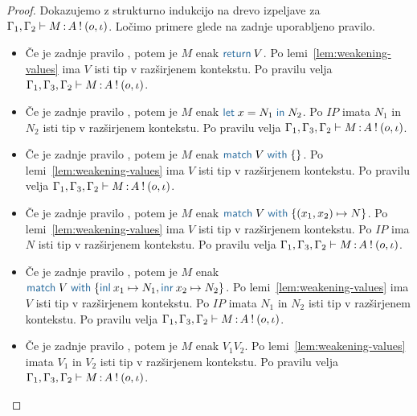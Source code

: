 \begin{proof}
	Dokazujemo z strukturno indukcijo na drevo izpeljave za $\Gamma_1, \Gamma_2 \vdash M \mathinner{:} A \mathbin{!} (o, \iota)$.
	Ločimo primere glede na zadnje uporabljeno pravilo.
	
	\begin{itemize}
		\item Če je zadnje pravilo , potem je $M$ enak $\tmreturn{V}$.
		Po lemi~\ref{lem:weakening-values} ima $V$ isti tip v razširjenem kontekstu.
		Po pravilu  velja $\Gamma_1, \Gamma_3, \Gamma_2 \vdash M \mathinner{:} A \mathbin{!} (o, \iota)$.
		
		\item Če je zadnje pravilo , potem je $M$ enak $\tmlet{x}{N_1}{N_2}$.
		Po $IP$ imata $N_1$ in $N_2$ isti tip v razširjenem kontekstu.
		Po pravilu  velja $\Gamma_1, \Gamma_3, \Gamma_2 \vdash M \mathinner{:} A \mathbin{!} (o, \iota)$.
		
		\item Če je zadnje pravilo , potem je $M$ enak $\tmmatch{V}{}$.
		Po lemi~\ref{lem:weakening-values} ima $V$ isti tip v razširjenem kontekstu.
		Po pravilu  velja $\Gamma_1, \Gamma_3, \Gamma_2 \vdash M \mathinner{:} A \mathbin{!} (o, \iota)$.
		
		\item Če je zadnje pravilo , potem je $M$ enak $\tmmatch{V}{(x_1,x_2) \mapsto N}$. 
		Po lemi~\ref{lem:weakening-values} ima $V$ isti tip v razširjenem kontekstu.
		Po $IP$ ima $N$ isti tip v razširjenem kontekstu.
		Po pravilu  velja $\Gamma_1, \Gamma_3, \Gamma_2 \vdash M \mathinner{:} A \mathbin{!} (o, \iota)$.
		
		\item Če je zadnje pravilo , potem je $M$ enak $\tmmatch{V}{\tminl{x_1} \mapsto N_1, \tminr{x_2} \mapsto N_2}$.
		Po lemi~\ref{lem:weakening-values} ima $V$ isti tip v razširjenem kontekstu.
		Po $IP$ imata $N_1$ in $N_2$ isti tip v razširjenem kontekstu.
		Po pravilu  velja $\Gamma_1, \Gamma_3, \Gamma_2 \vdash M \mathinner{:} A \mathbin{!} (o, \iota)$.
		
		\item Če je zadnje pravilo , potem je $M$ enak $V_1 V_2$.
		Po lemi~\ref{lem:weakening-values} imata $V_1$ in $V_2$ isti tip v razširjenem kontekstu.
		Po pravilu  velja $\Gamma_1, \Gamma_3, \Gamma_2 \vdash M \mathinner{:} A \mathbin{!} (o, \iota)$.
		

\end{itemize}
\end{proof}
